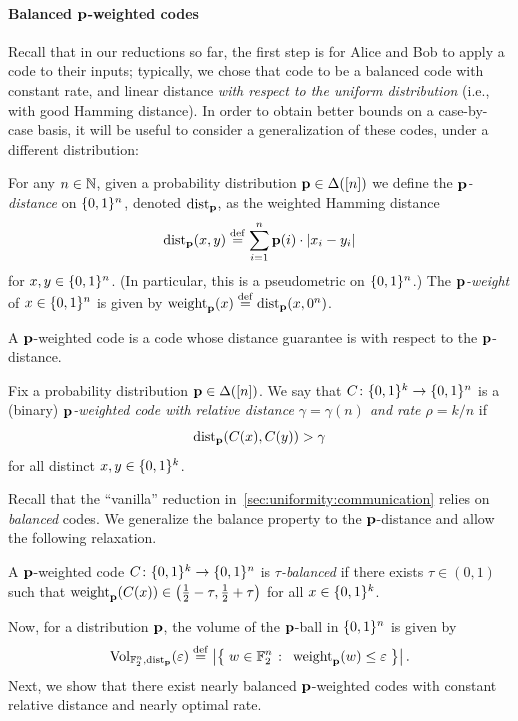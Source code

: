 \paragraph{Balanced $\p$-weighted codes}
Recall that in our reductions so far, the first step is for Alice and Bob to apply a code to their inputs; typically, we chose that code to be a balanced code with constant rate, and linear distance \emph{with respect to the uniform distribution} (i.e., with good Hamming distance). In order to obtain better bounds on a case-by-case basis, it will be useful to consider a generalization of these codes, under a different distribution:
\begin{definition}[$\p$-distance]
For any $n\in\N$, given a probability distribution $\p\in\distribs{[n]}$ we define the \emph{$\p$-distance} on $\bitset^n$, denoted $\pdistfunc[\p]$, as the weighted Hamming distance
\[
    \pdist[\p]{x}{y} \eqdef \sum_{i=1}^{n} \p(i)\cdot\abs{ x_i - y_i }
\]
for $x,y\in\bitset^n$. (In particular, this is a pseudometric on $\bitset^n$.) The \emph{$\p$-weight} of $x\in\bitset^n$ is given by $\pweight[\p]{x} \eqdef \pdist[\p]{x}{0^n}$.
\end{definition}

A $\p$-weighted code is a code whose distance guarantee is with respect to the $\p$-distance. 
\begin{definition}
Fix a probability distribution $\p\in\distribs{[n]}$. We say that $C\colon\bitset^k\to\bitset^n$ is a (binary) \emph{$\p$-weighted code with relative distance $\gamma=\gamma(n)$ and rate $\rho = k/n$} if \[\pdist[\p]{C(x)}{C(y)} > \gamma\] for all distinct $x,y\in \bitset^k$.
\end{definition}

Recall that the ``vanilla'' reduction in~\cref{sec:uniformity:communication} relies on \emph{balanced} codes. We generalize the balance property to the $\p$-distance and allow the following relaxation.
\begin{definition}
	A $\p$-weighted code $C\colon\bitset^k\to\bitset^n$ is \emph{$\tau$-balanced} if there exists $\tau \in(0,1)$ such that $\pweight[\p]{C(x)}\in\left(\frac{1}{2} -\tau, \frac{1}{2}+\tau\right)$ for all $x\in\bitset^k$.
\end{definition}
Now, for a distribution $\p$, the volume of the $\p$-ball in $\bitset^n$ is given by
\[
 \operatorname{Vol}_{\mathbb{F}_2^n,\pdistfunc[\p]}(\eps) 
    \eqdef \abs{ \setOfSuchThat{w\in \mathbb{F}_2^n }{ \pweight[\p]{w} \leq \eps } }.
\]
Next, we show that there exist nearly balanced $\p$-weighted codes with constant relative distance and nearly optimal rate.
 
